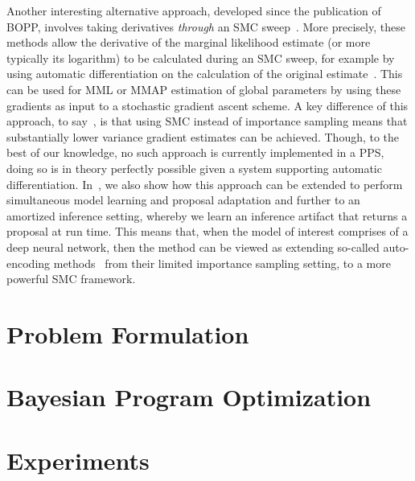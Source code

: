Another interesting alternative approach,
developed since the publication of BOPP, involves taking derivatives \emph{through} an SMC
sweep~\citep{le2017auto,naesseth2017variational,maddison2017filtering}. 
More precisely, these methods allow the derivative of the marginal likelihood estimate (or more typically
its logarithm) to be calculated during an SMC sweep, for example by using automatic differentiation
on the calculation of the original estimate~\citep{le2017auto}.  This can be used for MML or MMAP estimation
of global parameters by using these gradients as input to a stochastic gradient ascent scheme.
A key difference of this approach, to say~\cite{vandemeent2016black}, is that using SMC instead of importance
sampling means that substantially lower variance gradient estimates can be achieved.
Though, to the best of our knowledge, no such approach is currently implemented in a PPS, doing so is 
in theory perfectly possible given a system supporting automatic differentiation.  
In~\cite{le2017auto}, we also show how this approach can be extended to perform simultaneous model
learning and proposal adaptation and further to an amortized inference setting, whereby we learn an inference
artifact that returns a proposal at run time.  This means that, when the model of interest comprises of
a deep neural network, then the method can be viewed as extending so-called auto-encoding methods~\citep{kingma2014auto,burda2015importance}
from their limited importance sampling setting, to a more powerful SMC framework.

\section{Problem Formulation}
\label{sec:problem}



\section{Bayesian Program Optimization}
\label{sec:bopp}


%
%
%

\section{Experiments}
\label{sec:bopp:exp}

